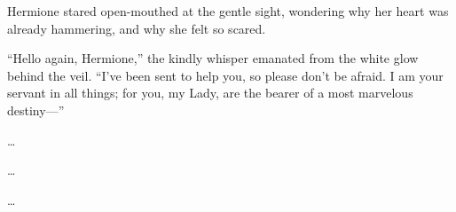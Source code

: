 Hermione stared open-mouthed at the gentle sight, wondering why her heart was
already hammering, and why she felt so scared.

“Hello again, Hermione,” the kindly whisper emanated from the white glow behind
the veil. “I’ve been sent to help you, so please don’t be afraid. I am your
servant in all things; for you, my Lady, are the bearer of a most marvelous
destiny—”

\begin{center}
…

…

…
\end{center}
